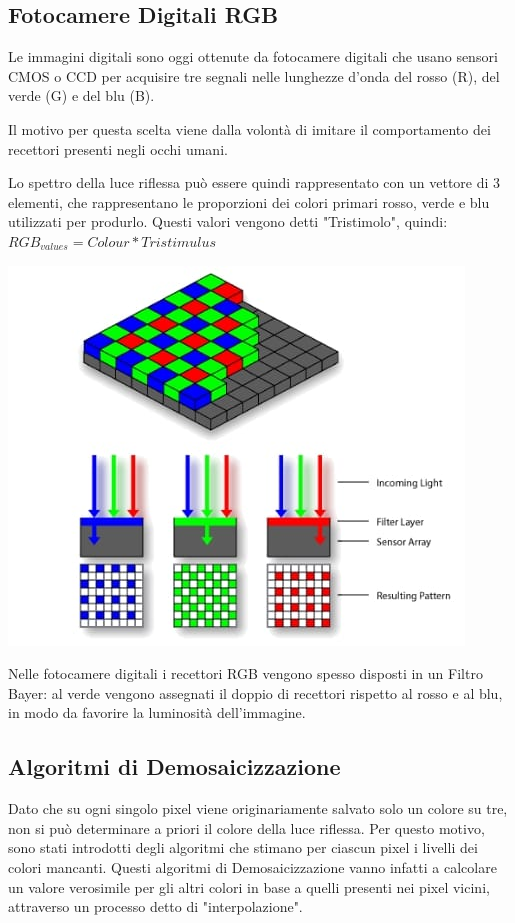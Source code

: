 \documentclass[a4paper,11pt]{article} %
\begin{document}
\subsection{Fotocamere Digitali RGB}
\begin{minipage}{0.6\textwidth}
Le immagini digitali sono oggi ottenute da fotocamere digitali che usano sensori CMOS o CCD per acquisire tre segnali nelle lunghezze d'onda del rosso (R), del verde (G) e del blu (B).

Il motivo per questa scelta viene dalla volontà di imitare il comportamento dei recettori presenti negli occhi umani.

Lo spettro della luce riflessa può essere quindi rappresentato con un vettore di 3 elementi, che rappresentano le proporzioni dei colori primari rosso, verde e blu utilizzati per produrlo. Questi valori vengono detti "Tristimolo", quindi: $ RGB_{values}=Colour*Tristimulus $
\end{minipage}
\begin{minipage}{0.4\textwidth}
    \includegraphics[width=\textwidth]{BayerPatternRGB}
\end{minipage}

Nelle fotocamere digitali i recettori RGB vengono spesso disposti in un Filtro Bayer: al verde vengono assegnati il doppio di recettori rispetto al rosso e al blu, in modo da favorire la luminosità dell'immagine. 

\subsection{Algoritmi di Demosaicizzazione}
Dato che su ogni singolo pixel viene originariamente salvato solo un colore su tre, non si può determinare a priori il colore della luce riflessa. Per questo motivo, sono stati introdotti degli algoritmi che stimano per ciascun pixel i livelli dei colori mancanti. Questi algoritmi di Demosaicizzazione vanno infatti a calcolare un valore verosimile per gli altri colori in base a quelli presenti nei pixel vicini, attraverso un processo detto di "interpolazione".
\end{document}
